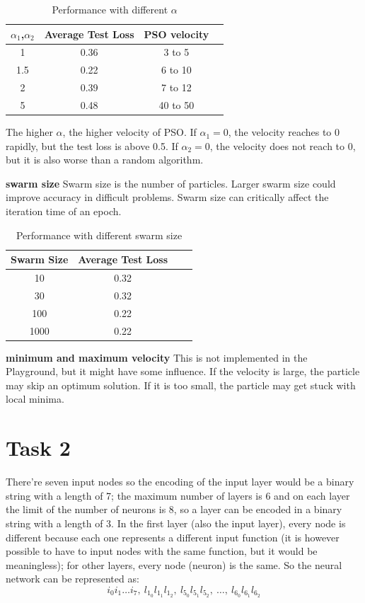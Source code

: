 \documentclass[12pt]{article}
\begin{document}
\begin{table}[!ht]
\centering
\begin{tabular}{@{}cccc@{}}
\toprule
$\alpha_1$,$\alpha_2$ & Average Test Loss & PSO velocity \\ \midrule
1 & 0.36 & 3 to 5  \\
1.5 & 0.22  &  6 to 10  \\
2 & 0.39  &   7 to 12 \\
5  & 0.48  &  40 to 50  \\
\bottomrule
\end{tabular}
\caption{Performance with different $\alpha$}
\label{t_alpha}
\end{table}
\noindent The higher $\alpha$, the higher velocity of PSO.
If $\alpha_1 = 0$, the velocity reaches to 0 rapidly, but the test loss is above 0.5. If $\alpha_2 = 0$, the velocity does not reach to 0, but it is also worse than a random algorithm.

\noindent \textbf{swarm size}
Swarm size is the number of particles. Larger swarm size could improve accuracy in difficult problems. Swarm size can critically affect the iteration time of an epoch.
\begin{table}[!ht]
\centering
\begin{tabular}{@{}cccc@{}}
\toprule
Swarm Size & Average Test Loss  \\ \midrule
10 & 0.32 \\
30 & 0.32    \\
100 & 0.22  \\
1000  & 0.22   \\
\bottomrule
\end{tabular}
\caption{Performance with different swarm size}
\label{t_swarm}
\end{table}

\noindent \textbf{minimum and maximum velocity}
This is not implemented in the Playground, but it might have some influence. If the velocity is large, the particle may skip an optimum solution. If it is too small, the particle may get stuck with local minima.

\section{Task 2}
There're seven input nodes so the encoding of the input layer would be a binary string with a length of 7; the maximum number of layers is 6 and on each layer the limit of the number of neurons is 8, so a layer can be encoded in a binary string with a length of 3. In the first layer (also the input layer), every node is different because each one represents a different input function (it is however possible to have to input nodes with the same function, but it would be meaningless); for other layers, every node (neuron) is the same. So the neural network can be represented as:
$$
{i_0i_1\ldots i_7,\ l_{1_0}l_{1_1}l_{1_2},\ l_{5_0}l_{5_1}l_{5_2},\ \ldots,\ l_{6_0}l_{6_1}l_{6_2}}
$$
\end{document}
